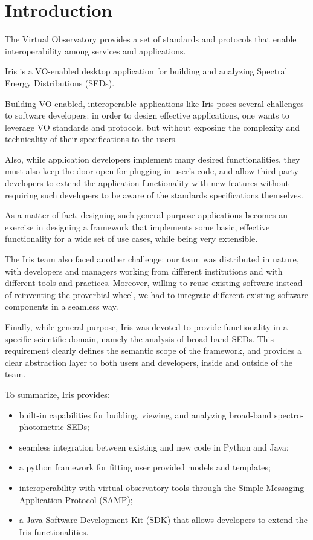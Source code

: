 \section{Introduction} 
The Virtual Observatory provides a set of standards and protocols that enable interoperability among services and applications.

Iris is a VO-enabled desktop application for building and analyzing Spectral Energy Distributions (SEDs).

Building VO-enabled, interoperable applications like Iris poses several challenges to software developers:  in order to design effective applications, one wants to leverage VO standards and protocols, but without exposing the complexity and technicality of their specifications to the users.

Also, while application developers implement many desired functionalities, they must also keep the door open for plugging in user's code, and allow third party developers to extend the application functionality with new features without requiring such developers to be aware of the standards specifications themselves.

As a matter of fact, designing such general purpose applications becomes an exercise in designing a framework that implements some basic, effective functionality for a wide set of use cases, while being very extensible.

The Iris team also faced another challenge: our team was distributed in nature, with developers and managers working from different institutions and with different tools and practices. Moreover, willing to reuse existing software instead of reinventing the proverbial wheel, we had to integrate different existing software components in a seamless way.

Finally, while general purpose, Iris was devoted to provide functionality in a specific scientific domain, namely the analysis of broad-band SEDs. This requirement clearly defines the semantic scope of the framework, and provides a clear abstraction layer to both users and developers, inside and outside of the team.

To summarize, Iris provides:
\begin{itemize}
\item built-in capabilities for building, viewing, and analyzing broad-band spectro-photometric SEDs;
\item seamless integration between existing and new code in Python and Java;
\item a python framework for fitting user provided models and templates;
\item interoperability with virtual observatory tools through the Simple Messaging Application Protocol (SAMP);
\item a Java Software Development Kit (SDK) that allows developers to extend the Iris functionalities.
\end{itemize}

